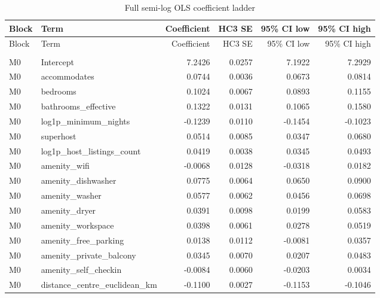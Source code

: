 \begin{landscape}
\small
\begin{longtable}{>{\raggedright\arraybackslash}p{2cm}>{\raggedright\arraybackslash}p{9cm}rrrr}
\caption{Full semi-log OLS coefficient ladder}\label{tab:app-full-coefficients}\\
\toprule
Block & Term & Coefficient & HC3 SE & 95\% CI low & 95\% CI high \\
\midrule
\endfirsthead
\toprule
Block & Term & Coefficient & HC3 SE & 95\% CI low & 95\% CI high \\
\midrule
\endhead
\addlinespace[0.5em]
\multicolumn{6}{l}{\textbf{M0}} \\
M0 & Intercept & 7.2426 & 0.0257 & 7.1922 & 7.2929 \\
M0 & accommodates & 0.0744 & 0.0036 & 0.0673 & 0.0814 \\
M0 & bedrooms & 0.1024 & 0.0067 & 0.0893 & 0.1155 \\
M0 & bathrooms\_\allowbreak{}effective & 0.1322 & 0.0131 & 0.1065 & 0.1580 \\
M0 & log1p\_\allowbreak{}minimum\_\allowbreak{}nights & -0.1239 & 0.0110 & -0.1454 & -0.1023 \\
M0 & superhost & 0.0514 & 0.0085 & 0.0347 & 0.0680 \\
M0 & log1p\_\allowbreak{}host\_\allowbreak{}listings\_\allowbreak{}count & 0.0419 & 0.0038 & 0.0345 & 0.0493 \\
M0 & amenity\_\allowbreak{}wifi & -0.0068 & 0.0128 & -0.0318 & 0.0182 \\
M0 & amenity\_\allowbreak{}dishwasher & 0.0775 & 0.0064 & 0.0650 & 0.0900 \\
M0 & amenity\_\allowbreak{}washer & 0.0577 & 0.0062 & 0.0456 & 0.0698 \\
M0 & amenity\_\allowbreak{}dryer & 0.0391 & 0.0098 & 0.0199 & 0.0583 \\
M0 & amenity\_\allowbreak{}workspace & 0.0398 & 0.0061 & 0.0278 & 0.0519 \\
M0 & amenity\_\allowbreak{}free\_\allowbreak{}parking & 0.0138 & 0.0112 & -0.0081 & 0.0357 \\
M0 & amenity\_\allowbreak{}private\_\allowbreak{}balcony & 0.0345 & 0.0070 & 0.0207 & 0.0483 \\
M0 & amenity\_\allowbreak{}self\_\allowbreak{}checkin & -0.0084 & 0.0060 & -0.0203 & 0.0034 \\
M0 & distance\_\allowbreak{}centre\_\allowbreak{}euclidean\_\allowbreak{}km & -0.1100 & 0.0027 & -0.1153 & -0.1046 \\

\end{longtable}
\end{landscape}
